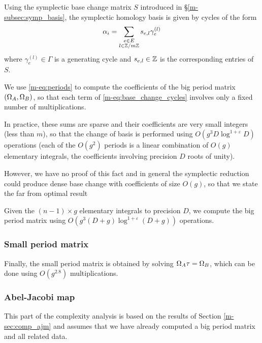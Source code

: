 \documentclass[main.tex]{subfiles}
\begin{document}
   Using the symplectic base change matrix $S$ introduced
   in \S \ref{m-subsec:symp_basis}, the symplectic homology basis is given
   by cycles of the form
   \begin{equation}
       \label{eq:base_change_cycles}
       \alpha_i = \sum_{\substack{e \in E \\ l\in\mathbb{Z}/m\mathbb{Z}}} s_{e,l}\gamma_e^{(l)}
   \end{equation}
   where $\gamma_e^{(l)} \in \Gamma$ is a generating cycle
   and $s_{e,l}\in\mathbb{Z}$ is the corresponding entries of $S$.

   We use \eqref{m-eq:periods} to compute the coefficients of the big period
   matrix $(\Omega_A,\Omega_B)$, so that each term of \eqref{m-eq:base_change_cycles}
   involves only a fixed number of multiplications.

   In practice, these sums are sparse and their coefficients are very small integers
   (less than $m$), so that the change of basis is performed using
   $O(g^3D\log^{1+\varepsilon}D)$ operations
   (each of the $O(g^2)$ periods is a linear combination of $O(g)$ elementary integrals,
   the coefficients involving precision $D$ roots of unity).

   However, we have no proof of this fact and in general the symplectic reduction
   could produce dense base change with coefficients of size $O(g)$,
   so that we state the far from optimal result
   \begin{thm}
       Given the $(n-1)\times g$ elementary integrals to precision $D$,
       we compute the big period matrix using $O(g^3(D+g)\log^{1+\varepsilon}(D+g))$ operations.
   \end{thm}

   \subsubsection{Small period matrix}

   Finally, the small period matrix is obtained by solving $\Omega_A\tau=\Omega_B$,
   which can be done using $O(g^{2.8})$ multiplications.

   \subsubsection{Abel-Jacobi map}

  This part of the complexity analysis is based on the results of Section \ref{m-sec:comp_ajm} and assumes that we have already computed a big period matrix and all related data.
\end{document}
